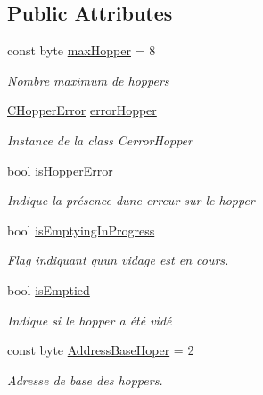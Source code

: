 \subsection*{Public Attributes}
\begin{DoxyCompactItemize}
\item 
const byte \mbox{\hyperlink{class_device_library_1_1_c_hopper_a109908437c130d0e5f081f13ab48c98c}{max\+Hopper}} = 8
\begin{DoxyCompactList}\small\item\em Nombre maximum de hoppers \end{DoxyCompactList}\item 
\mbox{\hyperlink{class_device_library_1_1_c_hopper_1_1_c_hopper_error}{C\+Hopper\+Error}} \mbox{\hyperlink{class_device_library_1_1_c_hopper_ad9d867e3315d21fea58b64b696fa8d17}{error\+Hopper}}
\begin{DoxyCompactList}\small\item\em Instance de la class Cerror\+Hopper \end{DoxyCompactList}\item 
bool \mbox{\hyperlink{class_device_library_1_1_c_hopper_a2489ae3898da396040859ec4c86bd3e0}{is\+Hopper\+Error}}
\begin{DoxyCompactList}\small\item\em Indique la présence d\textquotesingle{}une erreur sur le hopper \end{DoxyCompactList}\item 
bool \mbox{\hyperlink{class_device_library_1_1_c_hopper_aa78b1d599715ada39ff0a032db1703a0}{is\+Emptying\+In\+Progress}}
\begin{DoxyCompactList}\small\item\em Flag indiquant qu\textquotesingle{}un vidage est en cours. \end{DoxyCompactList}\item 
bool \mbox{\hyperlink{class_device_library_1_1_c_hopper_a13463c888437b418637de1d7e2cd4231}{is\+Emptied}}
\begin{DoxyCompactList}\small\item\em Indique si le hopper a été vidé \end{DoxyCompactList}\item 
const byte \mbox{\hyperlink{class_device_library_1_1_c_hopper_a8d069f368b3dd2356d76b8244181168b}{Address\+Base\+Hoper}} = 2
\begin{DoxyCompactList}\small\item\em Adresse de base des hoppers. \end{DoxyCompactList}\item 

\end{DoxyCompactItemize}
